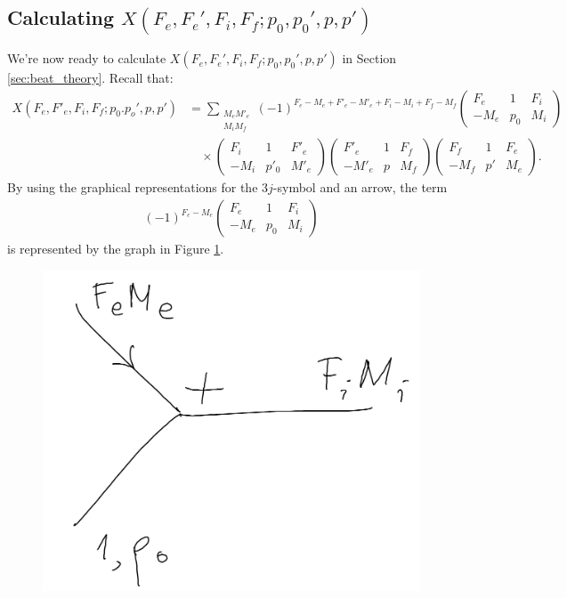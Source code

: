 \documentclass[11pt]{article}
\newcommand{\tj}[6]{ \begin{pmatrix}
		#1 & #2 & #3 \\
		#4 & #5 & #6 
\end{pmatrix}}
\begin{document}
\begin{appendices}
\subsection{Calculating $X(F_e, F_e', F_i, F_f; p_0, p_0', p,p')$}\label{app:X}
We're now ready to calculate $X(F_e, F_e', F_i, F_f; p_0, p_0', p,p')$ in Section \ref{sec:beat_theory}. Recall that:
\begin{align*}
X(F_e,F'_e,F_i,F_f;p_0.p_o',p,p') &= \sum_{\substack{M_eM'_e\\ M_i M_f}}(-1)^{F_e - M_e + F'_e - M'_e + F_i - M_i + F_f - M_f} \tj{F_e}{1}{F_i}{-M_e}{p_0}{M_i}\\ 
&\quad \times 
\tj{F_i}{1}{F'_e}{-M_i}{p'_0}{M'_e}
\tj{F'_e}{1}{F_f}{-M'_e}{p}{M_f}
\tj{F_f}{1}{F_e}{-M_f}{p'}{M_e}.
\end{align*}
By using the graphical representations for the $3j$-symbol and an arrow, the term
\begin{align*}
(-1)^{F_e - M_e} \tj{F_e}{1}{F_i}{-M_e}{p_0}{M_i}
\end{align*}
is represented by the graph in Figure \ref{fig:X1}.
\begin{figure}[!htb]
	\centering
	\includegraphics[scale=0.3]{draw_ang_1}
	\caption{}
	\label{fig:X1}
\end{figure}



\end{appendices}
\end{document}
